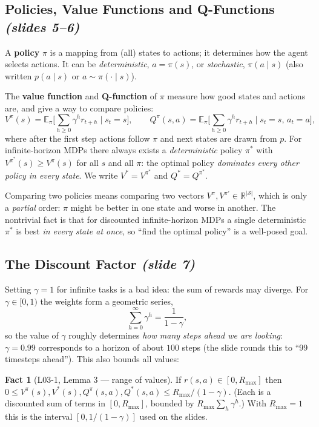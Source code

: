 \documentclass[11pt,a4paper]{article}
\newcommand{\R}{\mathbb{R}}
\newcommand{\E}{\mathbb{E}}
\newcommand{\cS}{\mathcal{S}}
\newcommand{\slides}[1]{\texorpdfstring{\emph{(slides #1)}}{(slides #1)}}
\newcommand{\slide}[1]{\texorpdfstring{\emph{(slide #1)}}{(slide #1)}}
\theoremstyle{plain}
\theoremstyle{definition}
\newtheorem{fact}{Fact}\renewcommand{\thefact}{F\arabic{fact}}
\theoremstyle{remark}
\begin{document}
\subsection{Policies, Value Functions and Q-Functions \slides{5--6}}
A \textbf{policy} $\pi$ is a mapping from (all) states to actions; it determines how the agent selects actions. It can be \emph{deterministic}, $a=\pi(s)$, or \emph{stochastic}, $\pi(a\mid s)$ (also written $p(a\mid s)$ or $a\sim\pi(\cdot\mid s)$).

The \textbf{value function} and \textbf{Q-function} of $\pi$ measure how good states and actions are, and give a way to compare policies:
\[
V^\pi(s)=\E_\pi\Big[\sum_{h\ge0}\gamma^h r_{t+h}\;\Big|\;s_t=s\Big],\qquad
Q^\pi(s,a)=\E_\pi\Big[\sum_{h\ge0}\gamma^h r_{t+h}\;\Big|\;s_t=s,\,a_t=a\Big],
\]
where after the first step actions follow $\pi$ and next states are drawn from $p$. For infinite-horizon MDPs there always exists a \emph{deterministic} policy $\pi^*$ with $V^{\pi^*}(s)\ge V^\pi(s)$ for all $s$ and all $\pi$: the optimal policy \emph{dominates every other policy in every state}. We write $V^*=V^{\pi^*}$ and $Q^*=Q^{\pi^*}$.

\begin{intuition}
Comparing two policies means comparing two vectors $V^\pi,V^{\pi'}\in\R^{|\cS|}$, which is only a \emph{partial} order: $\pi$ might be better in one state and worse in another. The nontrivial fact is that for discounted infinite-horizon MDPs a single deterministic $\pi^*$ is best \emph{in every state at once}, so ``find the optimal policy'' is a well-posed goal.
\end{intuition}

\subsection{The Discount Factor \slide{7}}
Setting $\gamma=1$ for infinite tasks is a bad idea: the sum of rewards may diverge. For $\gamma\in[0,1)$ the weights form a geometric series,
\[
\sum_{h=0}^{\infty}\gamma^h=\frac1{1-\gamma},
\]
so the value of $\gamma$ roughly determines \emph{how many steps ahead we are looking}: $\gamma=0.99$ corresponds to a horizon of about $100$ steps (the slide rounds this to ``99 timesteps ahead''). This also bounds all values:

\begin{fact}[L03-1, Lemma 3 --- range of values]\label{fact:range}
If $r(s,a)\in[0,R_{\max}]$ then $0\le V^\pi(s),V^*(s),Q^\pi(s,a),Q^*(s,a)\le R_{\max}/(1-\gamma)$. (Each is a discounted sum of terms in $[0,R_{\max}]$, bounded by $R_{\max}\sum_h\gamma^h$.) With $R_{\max}=1$ this is the interval $[0,1/(1-\gamma)]$ used on the slides.
\end{fact}
\end{document}
